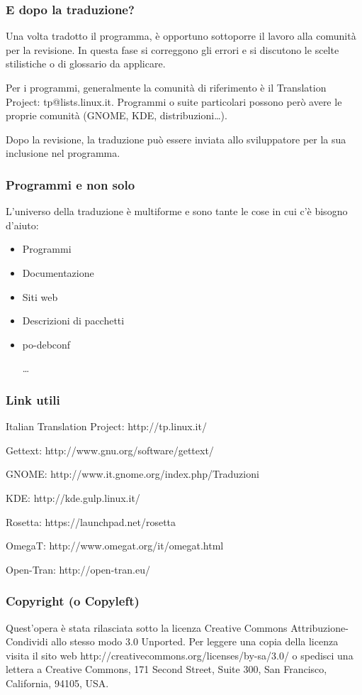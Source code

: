 \documentclass{beamer}
\begin{document}
\begin{frame}\frametitle{E dopo la traduzione?}
Una volta tradotto il programma, è opportuno sottoporre il lavoro alla
comunità per la revisione. In questa fase si correggono gli errori e
si discutono le scelte stilistiche o di glossario da applicare.

Per i programmi, generalmente la comunità di riferimento è il
Translation Project: tp@lists.linux.it. Programmi o suite particolari
possono però avere le proprie comunità (GNOME, KDE,
distribuzioni{\ldots}).

Dopo la revisione, la traduzione può essere inviata allo sviluppatore
per la sua inclusione nel programma.
\end{frame}

\begin{frame}\frametitle{Programmi e non solo}
L'universo della traduzione è multiforme e sono tante le cose in cui
c'è bisogno d'aiuto:

\begin{itemize}
\item Programmi
\item Documentazione
\item Siti web
\item Descrizioni di pacchetti
\item po-debconf
\item [{\ldots}]
\end{itemize}
\end{frame}

\begin{frame}\frametitle{Link utili}
Italian Translation Project: http://tp.linux.it/

Gettext: http://www.gnu.org/software/gettext/

GNOME: http://www.it.gnome.org/index.php/Traduzioni

KDE: http://kde.gulp.linux.it/

Rosetta: https://launchpad.net/rosetta

OmegaT: http://www.omegat.org/it/omegat.html

Open-Tran: http://open-tran.eu/
\end{frame}

\begin{frame}\frametitle{Copyright (o Copyleft)}
Quest'opera è stata rilasciata sotto la licenza Creative Commons
Attribuzione-Condividi allo stesso modo 3.0 Unported. Per leggere una
copia della licenza visita il sito web
http://creativecommons.org/licenses/by-sa/3.0/ o spedisci una lettera
a Creative Commons, 171 Second Street, Suite 300, San Francisco,
California, 94105, USA.
\end{frame}
\end{document}
